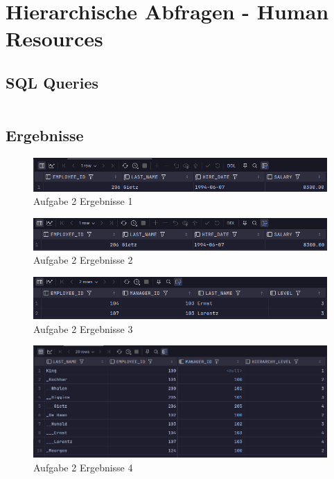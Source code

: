\documentclass[12pt]{scrartcl}
\begin{document}
\pagebreak

\section{Hierarchische Abfragen - Human Resources}

\subsection{SQL Queries}

\inputminted{sql}{../ue3_2.sql}

\subsection{Ergebnisse}

\begin{figure}[H]
	\centering
	\includegraphics[width=1\linewidth]{../ue3_2_1a.png}
	\caption{Aufgabe 2 Ergebnisse 1}
\end{figure}

\begin{figure}[H]
	\centering
	\includegraphics[width=1\linewidth]{../ue3_2_1b.png}
	\caption{Aufgabe 2 Ergebnisse 2}
\end{figure}

\begin{figure}[H]
	\centering
	\includegraphics[width=1\linewidth]{../ue3_2_2.png}
	\caption{Aufgabe 2 Ergebnisse 3}
\end{figure}

\begin{figure}[H]
	\centering
	\includegraphics[width=1\linewidth]{../ue3_2_3.png}
	\caption{Aufgabe 2 Ergebnisse 4}
\end{figure}
\end{document}
